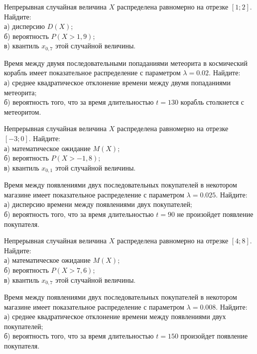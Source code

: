 \vfill

\newpage\setcounter{zad}{0}

\z Непрерывная случайная величина $X$ распределена равномерно на отрезке $[1; 2]$. Найдите: \\ \quad а) дисперсию $D(X)$; \\ \quad б) вероятность $P(X>1{,}9)$; \\ \quad в) квантиль $x_{0{,}7}$ этой случайной величины.


\vfill

\z Время между двумя последовательными попаданиями метеорита в космический корабль имеет показательное распределение с параметром $\lambda = 0.02$. Найдите: \\ \quad а) среднее квадратическое отклонение времени между двумя попаданиями метеорита; \\ \quad б) вероятность того, что за время длительностью $t = 130$ корабль  столкнется с метеоритом.
 

\vfill

\newpage\setcounter{zad}{0}

\z Непрерывная случайная величина $X$ распределена равномерно на отрезке $[-3; 0]$. Найдите: \\ \quad а) математическое ожидание $M(X)$; \\ \quad б) вероятность $P(X>-1{,}8)$; \\ \quad в) квантиль $x_{0{,}1}$ этой случайной величины.


\vfill

\z Время между появлениями двух последовательных покупателей в некотором магазине имеет показательное распределение с параметром $\lambda = 0.025$. Найдите: \\ \quad а) дисперсию времени между появлениями двух покупателей; \\ \quad б) вероятность того, что за время длительностью $t = 90$ не произойдет появление покупателя.
 

\vfill

\newpage\setcounter{zad}{0}

\z Непрерывная случайная величина $X$ распределена равномерно на отрезке $[4; 8]$. Найдите: \\ \quad а) математическое ожидание $M(X)$; \\ \quad б) вероятность $P(X>7{,}6)$; \\ \quad в) квантиль $x_{0{,}7}$ этой случайной величины.


\vfill

\z Время между появлениями двух последовательных покупателей в некотором магазине имеет показательное распределение с параметром $\lambda = 0.008$. Найдите: \\ \quad а) среднее квадратическое отклонение времени между появлениями двух покупателей; \\ \quad б) вероятность того, что за время длительностью $t = 150$  произойдет появление покупателя.
 

